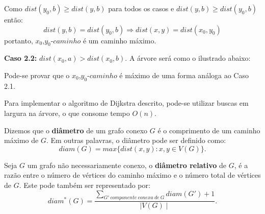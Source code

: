 \documentclass[a4paper,12pt]{article}
\begin{document}
\begin{itemize}
		\bigskip

		Como $dist(y_0,b)\ge dist(y,b)$ para todos os casos
		e $dist(y,b)\ge dist(y_0,b)$ então:
		$$ dist(y,b) =  dist(y_0,b) \Rightarrow
		dist(x,y) = dist(x_0,y_0) $$
		portanto, $x_0$,$y_0$-$caminho$ é um caminho máximo.

		\bigskip
		\bigskip

		\textbf{Caso 2.2:} $dist(x_0,a)> dist(x_0,b)$.
		A árvore será como o ilustrado abaixo:

		\begin{center} \end{center}

		Pode-se provar que o $x_0$,$y_0$-$caminho$ é 
		máximo de uma forma análoga ao Caso 2.1.



	Para implementar o algoritmo de Dijkstra descrito,
	pode-se utilizar buscas em largura na árvore, o
	que consome tempo $O(n).$



    \end{itemize}

	\newpage



		Dizemos que o \textbf{diâmetro} de um grafo conexo $G$ é o
		comprimento de um caminho máximo de $G$. 
		Em outras palavras, o diâmetro pode ser definido como:
		$$ diam(G)=max\{dist(x,y):x,y\in V(G)\}. $$

		\bigskip

		Seja $G$ um grafo não necessariamente conexo,
		o \textbf{diâmetro relativo} de $G$,
		 é a razão entre o número
		de vértices do caminho máximo e o número total de vértices
		de $G$. Este pode também ser representado por:
		$$ diam^*(G) = \frac{\displaystyle\sum_{
		G'~componente~conexa~de~G}^{}diam(G')+1}{\mid V(G)\mid}. $$
\end{document}
